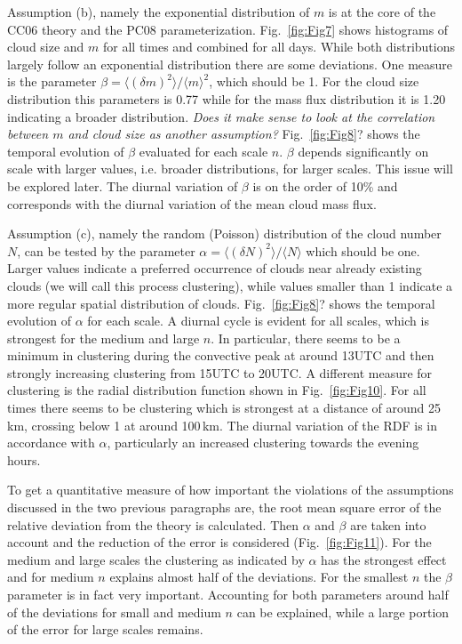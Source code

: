 \documentclass[a4paper, 12pt]{article}
\begin{document}
Assumption (b), namely the exponential distribution of $m$ is at the core of the CC06 theory and the PC08 parameterization. Fig.~\ref{fig:Fig7} shows histograms of cloud size and $m$ for all times and combined for all days. While both distributions largely follow an exponential distribution there are some deviations. One measure is the parameter $\beta = \langle (\delta m)^2 \rangle / \langle m \rangle^2$, which should be 1. For the cloud size distribution this parameters is 0.77 while for the mass flux distribution it is 1.20 indicating a broader distribution. \textit{Does it make sense to look at the correlation between $m$ and cloud size as another assumption?} Fig.~\ref{fig:Fig8}? shows the temporal evolution of $\beta$ evaluated for each scale $n$. $\beta$ depends significantly on scale with larger values, i.e. broader distributions, for larger scales. This issue will be explored later. The diurnal variation of $\beta$ is on the order of 10\% and corresponds with the diurnal variation of the mean cloud mass flux.

Assumption (c), namely the random (Poisson) distribution of the cloud number $N$, can be tested by the parameter $\alpha = \langle (\delta N)^2 \rangle / \langle N \rangle$ which should be one. Larger values indicate a preferred occurrence of clouds near already existing clouds (we will call this process clustering), while values smaller than 1 indicate a more regular spatial distribution of clouds. Fig.~\ref{fig:Fig8}? shows the temporal evolution of $\alpha$ for each scale. A diurnal cycle is evident for all scales, which is strongest for the medium and large $n$. In particular, there seems to be a minimum in clustering during the convective peak at around 13UTC and then strongly increasing clustering from 15UTC to 20UTC. A different measure for clustering is the radial distribution function shown in Fig.~\ref{fig:Fig10}. For all times there seems to be clustering which is strongest at a distance of around 25\,km, crossing below 1 at around 100\,km. The diurnal variation of the RDF is in accordance with $\alpha$, particularly an increased clustering towards the evening hours. 

To get a quantitative measure of how important the violations of the assumptions discussed in the two previous paragraphs are, the root mean square error of the relative deviation from the theory is calculated. Then $\alpha$ and $\beta$ are taken into account and the reduction of the error is considered (Fig.~\ref{fig:Fig11}). For the medium and large scales the clustering as indicated by $\alpha$ has the strongest effect and for medium $n$ explains almost half of the deviations. For the smallest $n$ the $\beta$ parameter is in fact very important. Accounting for both parameters around half of the deviations for small and medium $n$ can be explained, while a large portion of the error for large scales remains. 
\end{document}
